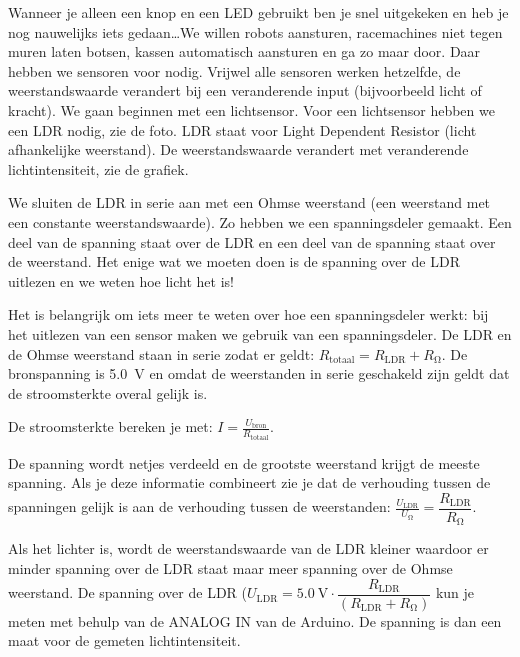 \documentclass{arduino}
\begin{document}


Wanneer je alleen een knop en een LED gebruikt ben je snel uitgekeken en heb je nog nauwelijks iets gedaan\dots We willen robots aansturen, racemachines niet tegen muren laten botsen, kassen automatisch aansturen en ga zo maar door. Daar hebben we sensoren voor nodig. Vrijwel alle sensoren werken hetzelfde, de weerstandswaarde verandert bij een veranderende input (bijvoorbeeld licht of kracht). We gaan beginnen met een lichtsensor. Voor een lichtsensor hebben we een LDR nodig, zie de foto. LDR staat voor Light Dependent Resistor (licht afhankelijke weerstand). De weerstandswaarde verandert met veranderende lichtintensiteit, zie de grafiek.


We sluiten de LDR in serie aan met een Ohmse weerstand (een weerstand met een constante weerstandswaarde). Zo hebben we een spanningsdeler gemaakt. Een deel van de spanning staat over de LDR en een deel van de spanning staat over de weerstand. Het enige wat we moeten doen is de spanning over de LDR uitlezen en we weten hoe licht het is!

Het is belangrijk om iets meer te weten over hoe een spanningsdeler werkt: bij het uitlezen van een sensor maken we gebruik van een spanningsdeler. De LDR en de Ohmse weerstand staan in serie zodat er geldt: $R_\mathrm{totaal} = R_\mathrm{LDR} + R_{\si{\ohm}}$. De bronspanning is \SI{5.0}{\volt} en omdat de weerstanden in serie geschakeld zijn geldt dat de stroomsterkte overal gelijk is.

De stroomsterkte bereken je met: $I = \frac{U_\mathrm{bron}}{R_\mathrm{totaal}}$. 

De spanning wordt netjes verdeeld en de grootste weerstand krijgt de meeste spanning. Als je deze informatie combineert zie je dat de verhouding tussen de spanningen gelijk is aan de verhouding tussen de weerstanden: $\frac{U_\mathrm{LDR}}{U_{\si{\ohm}}} = \dfrac{R_\mathrm{LDR}}{R_{\si{\ohm}}}$.


Als het lichter is, wordt de weerstandswaarde van de LDR kleiner waardoor er minder spanning over de LDR staat maar meer spanning over de Ohmse weerstand. De spanning over de LDR ($U_\mathrm{LDR} = \SI{5.0}{\volt} \cdot \dfrac{R_\mathrm{LDR}}{(R_\mathrm{LDR} + R_{\si{\ohm}})}$ kun je meten met behulp van de ANALOG IN van de Arduino. De spanning is dan een maat voor de gemeten lichtintensiteit. 
\end{document}
